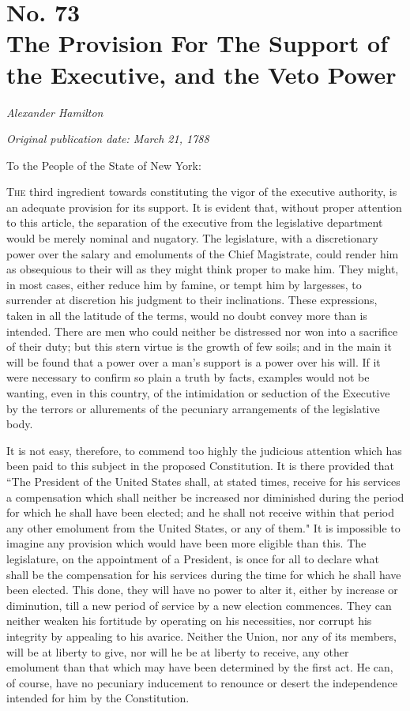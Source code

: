 \chapter[No. 73: The Provision For The Support of the Executive, and the Veto Power]{No. 73\\ {\small The Provision For The Support of the Executive, and the Veto Power}}

\textit{Alexander Hamilton}

\textit{Original publication date: March 21, 1788}
\vspace{1cm}

To the People of the State of New York:
\vspace{.4cm}

\textsc{The} third ingredient towards constituting the vigor of the executive authority, is an adequate provision for its support. 
It is evident that, without proper attention to this article, the separation of the executive from the legislative department would be merely nominal and nugatory. 
The legislature, with a discretionary power over the salary and emoluments of the Chief Magistrate, could render him as obsequious to their will as they might think proper to make him. 
They might, in most cases, either reduce him by famine, or tempt him by largesses, to surrender at discretion his judgment to their inclinations. 
These expressions, taken in all the latitude of the terms, would no doubt convey more than is intended. 
There are men who could neither be distressed nor won into a sacrifice of their duty; but this stern virtue is the growth of few soils; and in the main it will be found that a power over a man's support is a power over his will. 
If it were necessary to confirm so plain a truth by facts, examples would not be wanting, even in this country, of the intimidation or seduction of the Executive by the terrors or allurements of the pecuniary arrangements of the legislative body.

It is not easy, therefore, to commend too highly the judicious attention which has been paid to this subject in the proposed Constitution. 
It is there provided that ``The President of the United States shall, at stated times, receive for his services a compensation which shall neither be increased nor diminished during the period for which he shall have been elected; and he shall not receive within that period any other emolument from the United States, or any of them." It is impossible to imagine any provision which would have been more eligible than this. 
The legislature, on the appointment of a President, is once for all to declare what shall be the compensation for his services during the time for which he shall have been elected. 
This done, they will have no power to alter it, either by increase or diminution, till a new period of service by a new election commences. 
They can neither weaken his fortitude by operating on his necessities, nor corrupt his integrity by appealing to his avarice. 
Neither the Union, nor any of its members, will be at liberty to give, nor will he be at liberty to receive, any other emolument than that which may have been determined by the first act. 
He can, of course, have no pecuniary inducement to renounce or desert the independence intended for him by the Constitution.

